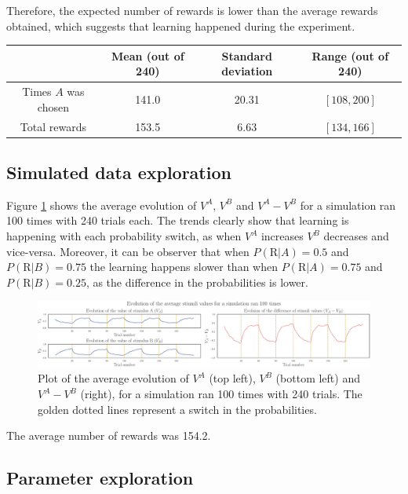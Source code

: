 \documentclass[12pt]{article}
\begin{document}
Therefore, the expected number of rewards is lower than the average rewards obtained, which suggests that learning happened during the experiment.

\begin{center}
 \begin{tabular}{|c || c | c | c|} 
 \hline
  & Mean (out of 240) & Standard deviation & Range (out of 240) \\ [0.5ex] 
 \hline\hline
 Times $A$ was chosen & 141.0 & 20.31 & $[108, 200]$ \\ 
 \hline
 Total rewards & 153.5 & 6.63 & $[134,166]$ \\ [1ex] 
 \hline
\end{tabular}
\end{center}

\subsection{Simulated data exploration}

Figure \ref{fig:2.2} shows the average evolution of $V^A$, $V^B$ and $V^A - V^B$ for a simulation ran 100 times with 240 trials each. The trends clearly show that learning is happening with each probability switch, as when $V^A$ increases $V^B$ decreases and vice-versa. Moreover, it can be observer that when $P(\mathrm{R} | A) = 0.5 $ and $P(\mathrm{R} | B) = 0.75$ the learning happens slower than when $P(\mathrm{R} | A) = 0.75 $ and $P(\mathrm{R} | B) = 0.25$, as the difference in the probabilities is lower.

\begin{figure}[h!]
	\centering
	\hspace*{-0.4in}
	\includegraphics[width=1\linewidth]{figures/2.2.pdf}
	\caption{Plot of the average evolution of $V^A$ (top left), $V^B$ (bottom left) and $V^A - V^B$ (right), for a simulation ran 100 times with 240 trials. The golden dotted lines represent a switch in the probabilities.}
	\label{fig:2.2}
\end{figure}

The average number of rewards was 154.2.

\subsection{Parameter exploration}
\end{document}
